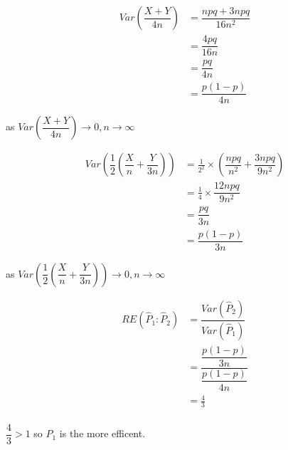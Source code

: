 \begin{example}
\begin{step}
        \begin{align*}
            Var\left(\dfrac{X + Y}{4n}\right) &= \dfrac{npq + 3npq}{16n^2}      \\
            &= \dfrac{4pq}{16n}                                                 \\
            &= \dfrac{pq}{4n}                                                   \\
            &= \dfrac{p(1-p)}{4n}
        \end{align*}

        \begin{center}
        as $Var\left(\dfrac{X + Y}{4n}\right) \rightarrow 0, n \rightarrow \infty$
        \end{center}

        \begin{align*}
            Var\left(\dfrac{1}{2}\left(\dfrac{X}{n} + \dfrac{Y}{3n}\right)\right) &= \frac{1}{2^2} \times \left(\dfrac{npq}{n^2}+\dfrac{3npq}{9n^2}\right)        \\
            &= \frac{1}{4} \times \dfrac{12npq}{9n^2}   \\
            &= \dfrac{pq}{3n}                           \\
            &= \dfrac{p(1-p)}{3n}
        \end{align*}

        \begin{center}
        as $Var\left(\dfrac{1}{2}\left(\dfrac{X}{n} + \dfrac{Y}{3n}\right)\right) \rightarrow 0, n \rightarrow \infty$
        \end{center}

        \begin{align*}
        RE(\hat{P}_1 : \hat{P}_2) &= \dfrac{Var(\hat{P}_2)}{Var(\hat{P}_1)}  \\
        &= \dfrac{\dfrac{p(1-p)}{3n}}{\dfrac{p(1-p)}{4n}}                               \\
        &= \frac{4}{3}                                                                  \\
        \end{align*}

        $\dfrac{4}{3} > 1$ so $\hat{P}_1$ is the more efficent.

        \end{step}

        \end{example}
    
